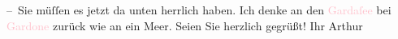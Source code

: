           \pstart
           – Sie müſſen es jetzt da unten herrlich haben. Ich denke an den \textcolor{pink}{Gardaſee}{}\ledrightnote{\textcolor{pink}{Lago di Garda}} bei \textcolor{pink}{Gardone}{}\ledrightnote{\textcolor{pink}{Gardone Riviera}} zurück wie
               an ein Meer.\pend
           \pstart Seien Sie herzlich gegrüßt! Ihr \spacefill\mbox{Arthur}\pend{}\endnumbering{}  
      